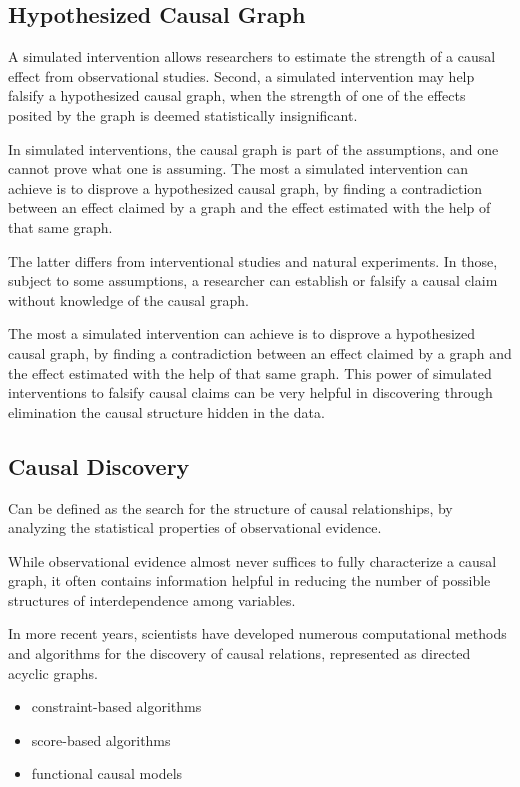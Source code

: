 \documentclass{article}
\begin{document}
\subsection{Hypothesized Causal Graph}

A simulated intervention allows researchers to estimate the strength of a causal effect from observational studies. Second, a simulated intervention may help falsify a hypothesized causal graph, when the strength of one of the effects posited by the graph is deemed statistically insignificant.

In simulated interventions, the causal graph is part of the assumptions, and one cannot prove what one is assuming. The most a simulated intervention can achieve is to disprove a hypothesized causal
graph, by finding a contradiction between an effect claimed by a graph and the effect estimated
with the help of that same graph.

The latter differs from interventional studies and natural experiments. In those, subject to some
assumptions, a researcher can establish or falsify a causal claim without knowledge of the causal
graph. 

The most a simulated intervention can achieve is to disprove a hypothesized causal graph, by finding a contradiction between an effect claimed by a graph and the effect estimated with the help of that same graph. This power of simulated interventions to falsify causal claims can be very helpful in discovering through elimination the causal structure hidden in the data.

\subsection{Causal Discovery}

Can be defined as the search for the structure of causal relationships, by analyzing the statistical properties of observational evidence.

While observational evidence almost never suffices to fully characterize a causal graph, it often contains information helpful in reducing the number of possible structures of interdependence among variables.

In more recent years, scientists have developed numerous computational methods and algorithms for the discovery of causal relations, represented as directed acyclic graphs.

\begin{itemize}
  \item constraint-based algorithms
  \item score-based algorithms
  \item functional causal models
\end{itemize}
\end{document}
